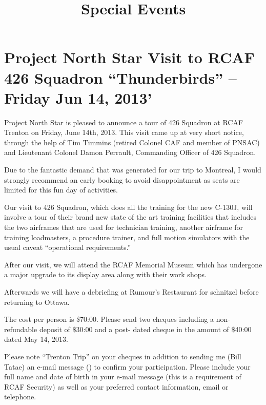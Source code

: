 



\title{Special Events}

\maketitle

\section{Project North Star Visit to RCAF 426 Squadron ``Thunderbirds''
  -- Friday Jun 14, 2013'}
\label{sec:trenton}

Project North Star is pleased to announce a tour of 426 Squadron at
RCAF Trenton on Friday, June 14th, 2013.  This visit came up at very
short notice, through the help of Tim Timmins (retired Colonel CAF and
member of PNSAC) and Lieutenant Colonel Damon Perrault, Commanding
Officer of 426 Squadron.

Due to the fantastic demand that was generated for our trip to
Montreal, I would strongly recommend an early booking to avoid
disappointment as seats are limited for this fun day of activities.

Our visit to 426 Squadron, which does all the training for the new
C-130J, will involve a tour of their brand new state of the art
training facilities that includes the two airframes that are used for
technician training, another airframe for training loadmasters, a
procedure trainer, and full motion simulators with the usual caveat
``operational requirements.''

After our visit, we will attend the RCAF Memorial Museum which has
undergone a major upgrade to its display area along with their work
shops.

Afterwards we will have a debriefing at Rumour's Restaurant for
schnitzel before returning to Ottawa.

The cost per person is \$70:00. Please send two cheques including a
non-refundable deposit of \$30:00 and a post- dated cheque in the
amount of \$40:00 dated May 14, 2013.
 
Please note ``Trenton Trip'' on your cheques in addition to sending me
(Bill Tatae) an e-mail message ()
to confirm your participation.  Please include your full name and date
of birth in your e-mail message (this is a requirement of RCAF
Security) as well as your preferred contact information, email or
telephone.


